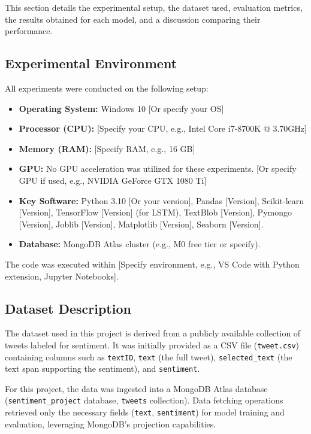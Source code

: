 \documentclass[10pt,twocolumn]{article}
\begin{document}
This section details the experimental setup, the dataset used, evaluation metrics, the results obtained for each model, and a discussion comparing their performance.

\subsection{Experimental Environment}
\label{subsec:exp_env}

All experiments were conducted on the following setup:
\begin{itemize}[itemsep=0pt, topsep=3pt]
    \item \textbf{Operating System:} Windows 10 [Or specify your OS]
    \item \textbf{Processor (CPU):} [Specify your CPU, e.g., Intel Core i7-8700K @ 3.70GHz]
    \item \textbf{Memory (RAM):} [Specify RAM, e.g., 16 GB]
    \item \textbf{GPU:} No GPU acceleration was utilized for these experiments. [Or specify GPU if used, e.g., NVIDIA GeForce GTX 1080 Ti]
    \item \textbf{Key Software:} Python 3.10 [Or your version], Pandas [Version], Scikit-learn [Version], TensorFlow [Version] (for LSTM), TextBlob [Version], Pymongo [Version], Joblib [Version], Matplotlib [Version], Seaborn [Version].
    \item \textbf{Database:} MongoDB Atlas cluster (e.g., M0 free tier or specify).
\end{itemize}
The code was executed within [Specify environment, e.g., VS Code with Python extension, Jupyter Notebooks].

\subsection{Dataset Description}
\label{subsec:exp_dataset}

The dataset used in this project is derived from a publicly available collection of tweets labeled for sentiment. It was initially provided as a CSV file (\texttt{tweet.csv}) containing columns such as \texttt{textID}, \texttt{text} (the full tweet), \texttt{selected\_text} (the text span supporting the sentiment), and \texttt{sentiment}. %

For this project, the data was ingested into a MongoDB Atlas database (\texttt{sentiment\_project} database, \texttt{tweets} collection). Data fetching operations retrieved only the necessary fields (\texttt{text}, \texttt{sentiment}) for model training and evaluation, leveraging MongoDB's projection capabilities. %
\end{document}
